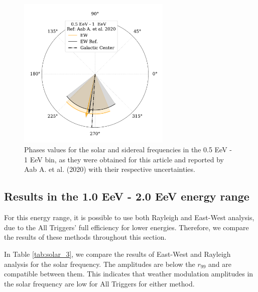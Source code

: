\documentclass[12pt, doublespace, oneside]{article}
\begin{document}
    \begin{figure}[H]
        \begin{small}
            \begin{center}
                \vspace*{-0.65 cm}
                \includegraphics[width=0.65\textwidth]{Figs/phase_segundo_bin_v3.pdf}
                \vspace*{-1.1 cm}
            \end{center}
            \caption{Phases values for the solar and sidereal frequencies in the 0.5 EeV - 1 EeV bin, as they were obtained for this article and reported by  Aab A. et al. (2020) \cite{Aab_2020} with their respective uncertainties.}
            \label{fig:segundo}
        \end{small}
    \end{figure}


\subsection{Results in the 1.0 EeV - 2.0 EeV energy range}

For this energy range, it is possible to use both Rayleigh and East-West analysis, due to the All Triggers' full efficiency for lower energies. Therefore, we compare the results of these methods throughout this section.


In Table  \ref{tab:solar_3},  we compare the results of East-West and Rayleigh analysis for the solar frequency. The amplitudes are below the $r_{99}$ and are compatible between them. This indicates that weather modulation amplitudes in the solar frequency are low for All Triggers for either method.
\end{document}
